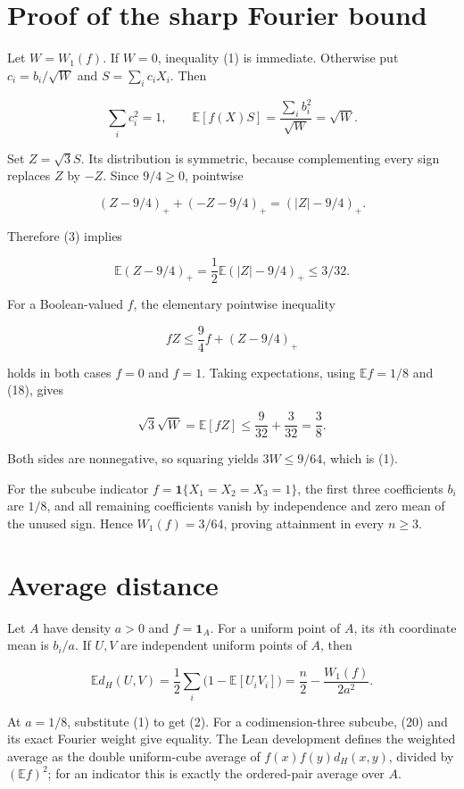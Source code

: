 \documentclass[11pt]{article}
\begin{document}
\section{Proof of the sharp Fourier bound}\label{proof-of-the-sharp-fourier-bound}

Let \(W=W_1(f)\). If \(W=0\), inequality (1) is immediate. Otherwise put
\(c_i=b_i/\sqrt W\) and \(S=\sum_i c_iX_i\). Then

\[\sum_i c_i^2=1,\qquad \mathbb E[f(X)S]=\frac{\sum_i b_i^2}{\sqrt W}=\sqrt W.\]

Set \(Z=\sqrt3S\). Its distribution is symmetric, because complementing
every sign replaces \(Z\) by \(-Z\). Since \(9/4\ge0\), pointwise

\[(Z-9/4)_++(-Z-9/4)_+=(|Z|-9/4)_+.\]

Therefore (3) implies

\[\mathbb E(Z-9/4)_+=\frac12\mathbb E(|Z|-9/4)_+\le3/32. \tag{18}\]

For a Boolean-valued \(f\), the elementary pointwise inequality

\[fZ\le\frac94 f+(Z-9/4)_+ \tag{19}\]

holds in both cases \(f=0\) and \(f=1\). Taking expectations, using
\(\mathbb Ef=1/8\) and (18), gives

\[\sqrt3\sqrt W=\mathbb E[fZ]\le\frac9{32}+\frac3{32}=\frac38.\]

Both sides are nonnegative, so squaring yields \(3W\le9/64\), which is
(1).

For the subcube indicator \(f=\mathbf1\{X_1=X_2=X_3=1\}\), the first
three coefficients \(b_i\) are \(1/8\), and all remaining coefficients
vanish by independence and zero mean of the unused sign. Hence
\(W_1(f)=3/64\), proving attainment in every \(n\ge3\).

\section{Average distance}\label{average-distance}

Let \(A\) have density \(a>0\) and \(f=\mathbf1_A\). For a uniform point
of \(A\), its \(i\)th coordinate mean is \(b_i/a\). If \(U,V\) are
independent uniform points of \(A\), then

\[\mathbb E d_H(U,V)
 =\frac12\sum_i\bigl(1-\mathbb E[U_iV_i]\bigr)
 =\frac n2-\frac{W_1(f)}{2a^2}. \tag{20}\]

At \(a=1/8\), substitute (1) to get (2). For a codimension-three
subcube, (20) and its exact Fourier weight give equality. The Lean
development defines the weighted average as the double uniform-cube
average of \(f(x)f(y)d_H(x,y)\), divided by \((\mathbb Ef)^2\); for an
indicator this is exactly the ordered-pair average over \(A\).
\end{document}
